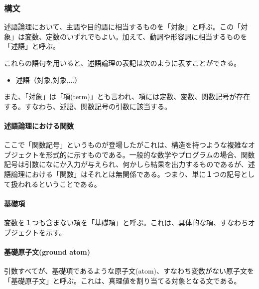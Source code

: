 \documentclass[dvipdfmx]{jsarticle}
\begin{document}
  \subsubsection{構文}
  述語論理において、主語や目的語に相当するものを「対象」と呼ぶ。この「対象」は変数、定数のいずれでもよい。加えて、動詞や形容詞に相当するものを「述語」と呼ぶ。\par
  これらの語句を用いると、述語論理の表記は次のように表すことができる。
  \begin{itemize}
    \item 述語（対象,対象,...）
  \end{itemize}
  また、「対象」は「項(term)」とも言われ、項には定数、変数、関数記号が存在する。すなわち、述語、関数記号の引数に該当する。\par
  \paragraph{述語論理における関数}
  ここで「関数記号」というものが登場したがこれは、構造を持つような複雑なオブジェクトを形式的に示すものである。一般的な数学やプログラムの場合、関数記号は引数になにか入力が与えられ、何かしら結果を出力するものであるが、述語論理における「関数」はそれとは無関係である。つまり、単に１つの記号として扱われるということである。\par
  \paragraph{基礎項}
  変数を１つも含まない項を「基礎項」と呼ぶ。これは、具体的な項、すなわちオブジェクトを示す。
  \paragraph{基礎原子文(ground atom)}
  引数すべてが、基礎項であるような原子文(atom)、すなわち変数がない原子文を「基礎原子文」と呼ぶ。これは、真理値を割り当てる対象となる文である。\par
\end{document}
